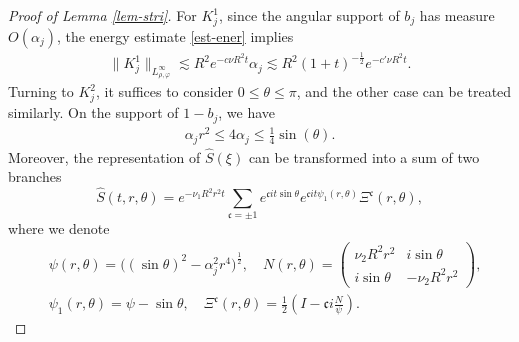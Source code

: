 \documentclass[12pt]{article}
\numberwithin{equation}{section}
\begin{document}
\begin{proof}[Proof of Lemma \ref{lem-stri}]
    For $K^1_j$, since the angular support of $b_j$ has measure $O(\alpha_j)$, the energy estimate \eqref{est-ener} implies
  	\begin{align*}
  		\|K^1_j\|_{L^\infty_{\rho,\varphi}}\lesssim R^2e^{-c\nu R^2 t}\alpha_j\lesssim R^2(1+t)^{-\frac{1}{2}}e^{-c'\nu R^2 t}.
  	\end{align*}
    Turning to $K^2_j$, it suffices to consider $0\leq\theta\leq\pi$, and the other case can be treated similarly. On the support of $1-b_j$, we have
  	\begin{align}\label{est-k2}
  		\alpha_j r^2\leq 4\alpha_j\leq\frac{1}{4}\sin(\theta).
  	\end{align}
  	Moreover, the representation of $\hat{S}(\xi)$ can be transformed into a sum of two branches
  	\begin{equation*}
  		\hat{S}(t,r,\theta)=e^{-\nu_1 R^2 r^2 t}\sum_{\mathfrak{c}=\pm1}e^{\mathfrak{c} it\sin\theta}e^{ \mathfrak{c}it\psi_1(r,\theta)}\Xi^{\mathfrak{c}}(r,\theta),
  	\end{equation*}
  	where we denote
  	\begin{align*}
    &\psi(r,\theta)=\big((\sin\theta)^2-\alpha_j^2r^4\big)^{\frac{1}{2}}, \quad N(r,\theta)=\left(\begin{array}{cc}
  			\nu_2R^2r^2&i\sin \theta\\
  			i\sin \theta&-\nu_2R^2r^2
  		\end{array}\right),\\
  		&\psi_1(r,\theta)=\psi-\sin\theta,\quad\Xi^{\mathfrak{c}}(r,\theta)=\frac{1}{2}\left(I-\mathfrak{c} i\frac{N}{\psi}\right).

\end{align*}
\end{proof}
\end{document}
